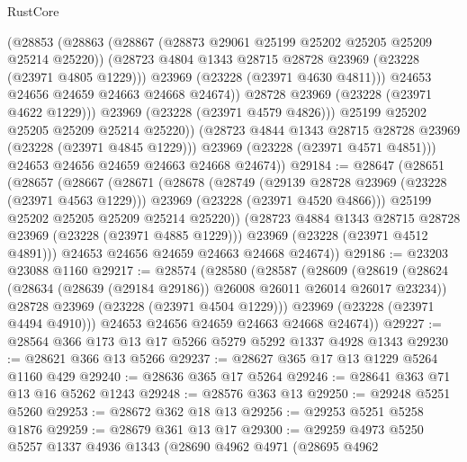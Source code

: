 \begin{lexlean}{RustCore}
\begin{coremodule}
                    (@28853
                      (@28863
                        (@28867 (@28873 @29061 @25199 @25202 @25205 @25209 @25214 @25220))
                        (@28723 @4804 @1343 @28715 @28728 @23969 (@23228 (@23971 @4805 @1229)))
                        @23969
                        (@23228 (@23971 @4630 @4811)))
                      @24653
                      @24656
                      @24659
                      @24663
                      @24668
                      @24674))
                  @28728
                  @23969
                  (@23228 (@23971 @4622 @1229)))
                @23969
                (@23228 (@23971 @4579 @4826)))
              @25199
              @25202
              @25205
              @25209
              @25214
              @25220))
          (@28723 @4844 @1343 @28715 @28728 @23969 (@23228 (@23971 @4845 @1229)))
          @23969
          (@23228 (@23971 @4571 @4851)))
        @24653
        @24656
        @24659
        @24663
        @24668
        @24674))
@29184 := @28647
    (@28651
      (@28657
        (@28667
          (@28671
            (@28678
              (@28749
                (@29139 @28728 @23969 (@23228 (@23971 @4563 @1229)))
                @23969
                (@23228 (@23971 @4520 @4866)))
              @25199
              @25202
              @25205
              @25209
              @25214
              @25220))
          (@28723 @4884 @1343 @28715 @28728 @23969 (@23228 (@23971 @4885 @1229)))
          @23969
          (@23228 (@23971 @4512 @4891)))
        @24653
        @24656
        @24659
        @24663
        @24668
        @24674))
@29186 := @23203 @23088 @1160
@29217 := @28574
    (@28580
      (@28587
        (@28609
          (@28619
            (@28624 (@28634 (@28639 (@29184 @29186)) @26008 @26011 @26014 @26017 @23234))
            @28728
            @23969
            (@23228 (@23971 @4504 @1229)))
          @23969
          (@23228 (@23971 @4494 @4910)))
        @24653
        @24656
        @24659
        @24663
        @24668
        @24674))
@29227 := @28564 @366 @173 @13 @17 @5266 @5279 @5292 @1337 @4928 @1343
@29230 := @28621 @366 @13 @5266
@29237 := @28627 @365 @17 @13 @1229 @5264 @1160 @429
@29240 := @28636 @365 @17 @5264
@29246 := @28641 @363 @71 @13 @16 @5262 @1243
@29248 := @28576 @363 @13
@29250 := @29248 @5251 @5260
@29253 := @28672 @362 @18 @13
@29256 := @29253 @5251 @5258 @1876
@29259 := @28679 @361 @13 @17
@29300 := @29259
    @4973
    @5250
    @5257
    @1337
    @4936
    @1343
    (@28690
      @4962
      @4971
      (@28695
        @4962

\end{coremodule}
\end{lexlean}
